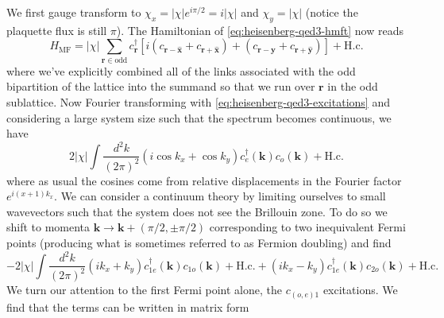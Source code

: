 \documentclass{report}
\begin{document}
We first gauge transform to $ \chi_x = |\chi| e^{i\pi/2}=i|\chi| $ and 
$ \chi_y = |\chi|  $ (notice the plaquette flux is still $ \pi $). The 
Hamiltonian of \cref{eq:heisenberg-qed3-hmft} now reads 
\begin{equation*}
	H_{\text{MF}}
		= |\chi| \sum_{\mathbf{r}\in \text{odd}}
		c_\mathbf{r}^\dagger [i(c_{\mathbf{r}-\hat{\mathbf{x}}} 
			+ c_{\mathbf{r} + \hat{\mathbf{x}}})
			+ 
		(c_{\mathbf{r}-\hat{\mathbf{y}}} 
			+ c_{\mathbf{r} + \hat{\mathbf{y}}})] + \text{H.c.}
\end{equation*}
where we've explicitly combined all of the links associated with the odd 
bipartition of the lattice into the summand so that we run over $ \mathbf{r} $
in the odd sublattice.
Now Fourier transforming with \cref{eq:heisenberg-qed3-excitations} and
considering a large system size such that the spectrum becomes continuous, 
we have 
\begin{equation*}
	2|\chi| \int\frac{d^2 k}{(2\pi)^2}
		\left(i\cos k_x + \cos k_y\right) c_e^\dagger(\mathbf{k}) c_o
		(\mathbf{k}) + \text{H.c.}
\end{equation*}
where as usual the cosines come from relative displacements in the 
Fourier factor $ e^{i (x + 1) k_x} $. We can consider a continuum theory 
by limiting ourselves to small wavevectors such that the system does not 
see the Brillouin zone. To do so we shift to momenta $ \mathbf{k} \rightarrow
\mathbf{k} + (\pi/2, \pm\pi/2)$ corresponding to two inequivalent Fermi points
(producing what is sometimes referred to as Fermion doubling) and find 
\begin{equation*}
	-2|\chi|\int\frac{d^2 k}{(2\pi)^2}
		\left(i k_x + k_y\right) c_{1e}^\dagger(\mathbf{k}) c_{1o}
		(\mathbf{k}) + \text{H.c.}
		+ 
		\left(i k_x - k_y\right) c_{1e}^\dagger(\mathbf{k}) c_{2o}
		(\mathbf{k}) + \text{H.c.}
\end{equation*}
We turn our attention to the first Fermi point alone, the $ c_{(o,e)1}  $ 
excitations. We find that the terms can be written in matrix form 
\end{document}
